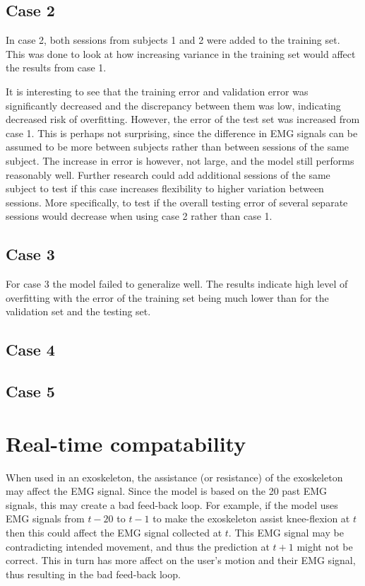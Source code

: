 \documentclass[../main.tex]{subfiles}
\begin{document}
\subsection{Case 2}
\label{sec:discussion-case2}
In case 2, both sessions from subjects 1 and 2 were added to the training set.
This was done to look at how increasing variance in the training set would affect the results from case 1.

It is interesting to see that the training error and validation error was significantly decreased and the discrepancy between them was low, indicating decreased risk of overfitting.
However, the error of the test set was increased from case 1.
This is perhaps not surprising, since the difference in \ac{EMG} signals can be assumed to be more between subjects rather than between sessions of the same subject.
The increase in error is however, not large, and the model still performs reasonably well.
Further research could add additional sessions of the same subject to test if this case increases flexibility to higher variation between sessions.
More specifically, to test if the overall testing error of several separate sessions would decrease when using case 2 rather than case 1.

\subsection{Case 3}
\label{sec:discussion-case3}
For case 3 the model failed to generalize well.
The results indicate high level of overfitting with the error of the training set being much lower than for the validation set and the testing set.

\subsection{Case 4}
\label{sec:discussion-case4}

\subsection{Case 5}
\label{sec:discussion-case5}


\section{Real-time compatability}
\label{sec:discussion_real-time}
When used in an exoskeleton, the assistance (or resistance) of the exoskeleton may affect the \ac{EMG} signal.
Since the model is based on the 20 past \ac{EMG} signals, this may create a bad feed-back loop.
For example, if the model uses \ac{EMG} signals from $t-20$ to $t-1$ to make the exoskeleton assist knee-flexion at $t$ then this could affect the \ac{EMG} signal collected at $t$.
This \ac{EMG} signal may be contradicting intended movement, and thus the prediction at $t+1$ might not be correct.
This in turn has more affect on the user's motion and their \ac{EMG} signal, thus resulting in the bad feed-back loop.
\end{document}
